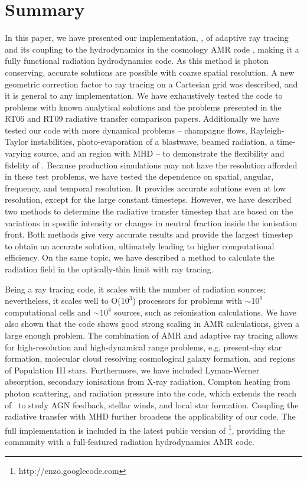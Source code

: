 \documentclass[useAMS,usenatbib]{mn2e}
\begin{document}
\section{Summary}

In this paper, we have presented our implementation, \moray, of
adaptive ray tracing \citep{Abel02_RT} and its coupling to the
hydrodynamics in the cosmology AMR code \enzo, making it a fully
functional radiation hydrodynamics code.  As this method is photon
conserving, accurate solutions are possible with coarse spatial
resolution.  A new geometric correction factor to ray tracing on a
Cartesian grid was described, and it is general to any implementation.
We have exhaustively tested the code to problems with known analytical
solutions and the problems presented in the RT06 and RT09 radiative
transfer comparison papers.  Additionally we have tested our code with
more dynamical problems -- champagne flows, Rayleigh-Taylor
instabilities, photo-evaporation of a blastwave, beamed radiation, a
time-varying source, and an \hii region with MHD -- to
demonstrate the flexibility and fidelity of \moray.  Because
production simulations may not have the resolution afforded in these
test problems, we have tested the dependence on spatial, angular,
frequency, and temporal resolution.  It provides accurate solutions
even at low resolution, except for the large constant timesteps.
However, we have described two methods to determine the radiative
transfer timestep that are based on the variations in specific
intensity or changes in neutral fraction inside the ionisation front.
Both methods give very accurate results and provide the largest
timestep to obtain an accurate solution, ultimately leading to higher
computational efficiency.  On the same topic, we have described a
method to calculate the radiation field in the optically-thin limit
with ray tracing.

Being a ray tracing code, it scales with the number of radiation
sources; nevertheless, it scales well to O($10^3$) processors for
problems with $\sim10^9$ computational cells and $\sim10^4$ sources,
such as reionisation calculations.  We have also shown that the code
shows good strong scaling in AMR calculations, given a large enough
problem.  The combination of AMR and adaptive ray tracing allows for
high-resolution and high-dynamical range problems, e.g. present-day
star formation, molecular cloud resolving cosmological galaxy
formation, and \hii regions of Population III stars.  Furthermore, we
have included Lyman-Werner absorption, secondary ionisations from
X-ray radiation, Compton heating from photon scattering, and radiation
pressure into the code, which extends the reach of \moray~to study
AGN feedback, stellar winds, and local star formation.  Coupling the
radiative transfer with MHD further broadens the applicability of our
code.  The full implementation is included in the latest public
version of \enzo\footnote{http://enzo.googlecode.com}, providing the
community with a full-featured radiation hydrodynamics AMR code.
\end{document}
